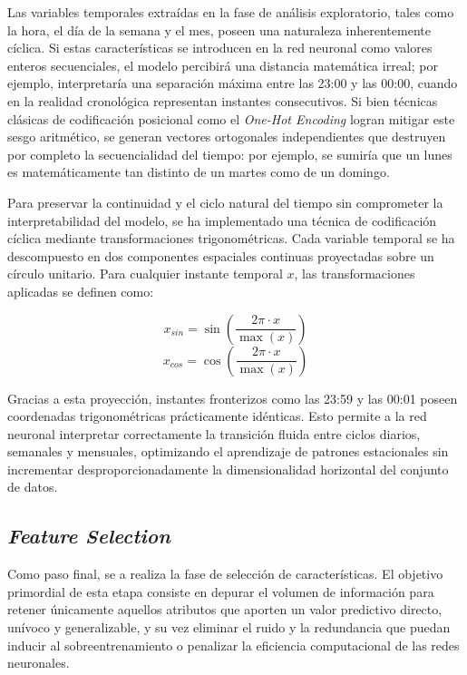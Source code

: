 Las variables temporales extraídas en la fase de análisis exploratorio, tales como la hora, el día de la semana y el mes, poseen una naturaleza inherentemente cíclica. Si estas características se introducen en la red neuronal como valores enteros secuenciales, el modelo percibirá una distancia matemática irreal; por ejemplo, interpretaría una separación máxima entre las 23:00 y las 00:00, cuando en la realidad cronológica representan instantes consecutivos. Si bien técnicas clásicas de codificación posicional como el \textit{One-Hot Encoding} logran mitigar este sesgo aritmético, se generan vectores ortogonales independientes que destruyen por completo la secuencialidad del tiempo: por ejemplo, se sumiría que un lunes es matemáticamente tan distinto de un martes como de un domingo.

Para preservar la continuidad y el ciclo natural del tiempo sin comprometer la interpretabilidad del modelo, se ha implementado una técnica de codificación cíclica mediante transformaciones trigonométricas. Cada variable temporal se ha descompuesto en dos componentes espaciales continuas proyectadas sobre un círculo unitario. Para cualquier instante temporal $x$, las transformaciones aplicadas se definen como:

$$x_{sin} = \sin\left(\frac{2 \pi \cdot x}{\max(x)}\right)$$
$$x_{cos} = \cos\left(\frac{2 \pi \cdot x}{\max(x)}\right)$$

Gracias a esta proyección, instantes fronterizos como las 23:59 y las 00:01 poseen coordenadas trigonométricas prácticamente idénticas. Esto permite a la red neuronal interpretar correctamente la transición fluida entre ciclos diarios, semanales y mensuales, optimizando el aprendizaje de patrones estacionales sin incrementar desproporcionadamente la dimensionalidad horizontal del conjunto de datos.


\subsection{\textit{Feature Selection}}
\label{subsec:feature_selection}

Como paso final, se a realiza la fase de selección de características. El objetivo primordial de esta etapa consiste en depurar el volumen de información para retener únicamente aquellos atributos que aporten un valor predictivo directo, unívoco y generalizable, y su vez eliminar el ruido y la redundancia que puedan inducir al sobreentrenamiento o penalizar la eficiencia computacional de las redes neuronales. 


